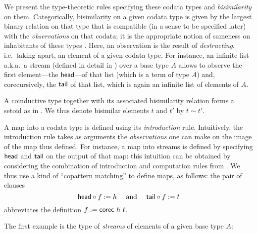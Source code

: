 \documentclass[a4paper,USenglish]{lipics}
\begin{document}
We present the type-theoretic rules specifying these codata types and \emph{bisimilarity} on them.
Categorically, bisimilarity on a given codata type is given by the largest binary relation on that type that is 
compatible (in a sense to be specified later) with the \emph{observations} on that codata; it is the appropriate notion of sameness on inhabitants of these types \parencite{DBLP:conf/types/Coquand93}.
Here, an observation is the result of \emph{destructing}, i.e.\ taking apart, an element of a given codata type.
For instance, an infinite list a.k.a.\ a stream (defined in detail in ) over a base type $A$ allows to observe the first element---the $\mathsf{head}$---of that list (which is a term of type $A$) and,
corecursively, the $\mathsf{tail}$ of that list, which is again an infinite list of elements of $A$.

A coinductive type together with its associated bisimilarity relation forms a setoid as in .
We thus denote bisimilar elements $t$ and $t'$ by $t \sim t'$. 

A map into a codata type is defined using its \emph{introduction} rule.
Intuitively, the introduction rule takes as arguments the \emph{observations} one can make on the image of the map thus defined.
For instance, a map into streams is defined by specifying $\mathsf{head}$ and $\mathsf{tail}$ on the output of that map: this intuition
  can be obtained by considering the combination of introduction and computation rules from .
  We thus use a kind of \enquote{copattern matching} \parencite{DBLP:conf/popl/AbelPTS13} to define maps, as follows: 
  the pair of clauses 
   \[{\mathsf{head}} \circ {f} := h \quad \text{ and } \quad {\ensuremath{\mathsf{tail}}} \circ {f}:= t \] abbreviates the definition $f := \mathsf{corec}~h~t$.







The first example is the type of \emph{streams} of elements of a given base type $A$:
\end{document}
